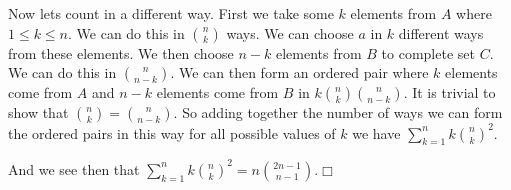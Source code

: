 \documentclass{article}
\begin{document}
Now lets count in a different way. First we take some $k$ elements from $A$ where $1\le k\le n$. We can do this in $\binom{n}{k}$ ways. We can choose $a$ in $k$ different ways from these elements. We then choose $n-k$ elements from $B$ to complete set $C$. We can do this in $\binom{n}{n-k}$. We can then form an ordered pair where $k$ elements come from $A$ and $n-k$ elements come from $B$ in $k\binom{n}{k}\binom{n}{n-k}$. It is trivial to show that $\binom{n}{k}=\binom{n}{n-k}$. So adding together the number of ways we can form the ordered pairs in this way for all possible values of $k$ we have $\sum\limits_{k=1}^n{k\binom{n}{k}^2}$.

And we see then that $\sum\limits_{k=1}^n{k\binom{n}{k}^2}=n\binom{2n-1}{n-1}$.$\Box$
\end{document}

